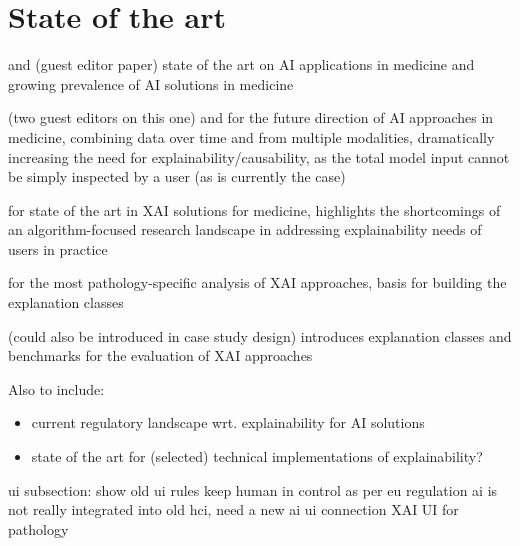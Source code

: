 \section{State of the art}
\label{sec:SOA}

\cite{holzinger_artificial_2020} and \cite{piccialli_survey_2021} (guest editor paper) state of the art on AI applications in medicine and growing prevalence of AI solutions in medicine

\cite{piccialli_artificial_2021} (two guest editors on this one) and \cite{HolzingerEtAl:2021:GraphFusion} for the future direction of AI approaches in medicine, combining data over time and from multiple modalities, dramatically increasing the need for explainability/causability, as the total model input cannot be simply inspected by a user (as is currently the case)

\cite{tjoa_survey_2020} for state of the art in XAI solutions for medicine, highlights the shortcomings of an algorithm-focused research landscape in addressing explainability needs of users in practice

\cite{poceviciute_survey_2020} for the most pathology-specific analysis of XAI approaches, basis for building the explanation classes

\cite{bodria_benchmarking_2021} (could also be introduced in case study design) introduces explanation classes and benchmarks for the evaluation of XAI approaches

Also to include: 
\begin{itemize}
\item current regulatory landscape wrt. explainability for AI solutions
\item state of the art for (selected) technical implementations of explainability?
\end{itemize}


ui subsection:
show old ui rules
keep human in control as per eu regulation
ai is not really integrated into old hci, need a new ai ui connection
\cite{tosun_histomapr_2020} XAI UI for pathology